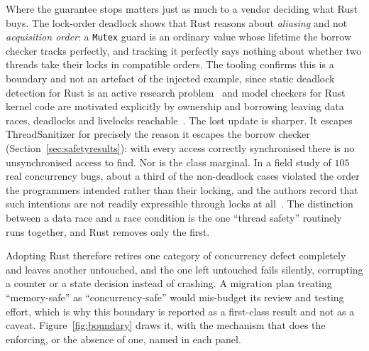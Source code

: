 \documentclass[english,oneside,a4paper,censored,csm,software-track-2020]{HYthesisML}
\begin{document}
Where the guarantee stops matters just as much to a vendor deciding what Rust buys. The lock-order
deadlock shows that Rust reasons about \emph{aliasing} and not \emph{acquisition order}: a
\texttt{Mutex} guard is an ordinary value whose lifetime the borrow checker tracks perfectly, and
tracking it perfectly says nothing about whether two threads take their locks in compatible
orders. The tooling confirms this is a boundary and not an artefact of the injected example, since
static deadlock detection for Rust is an active research problem~\cite{zhang2026deadlock} and
model checkers for Rust kernel code are motivated explicitly by ownership and borrowing leaving
data races, deadlocks and livelocks reachable~\cite{tang2025converos}. The lost update is sharper.
It escapes ThreadSanitizer for precisely the reason it escapes the borrow checker
(Section~\ref{sec:safetyresults}): with every access correctly synchronised there is no
unsynchronised access to find. Nor is the class marginal. In a field study of $105$ real
concurrency bugs, about a third of the non-deadlock cases violated the order the programmers
intended rather than their locking, and the authors record that such intentions are not readily
expressible through locks at all~\cite{lu2008mistakes}. The distinction between a data race and a
race condition is the one ``thread safety'' routinely runs together, and Rust removes only the
first.

Adopting Rust therefore retires one category of concurrency defect completely and leaves another
untouched, and the one left untouched fails silently, corrupting a counter or a state decision
instead of crashing. A migration plan treating ``memory-safe'' as ``concurrency-safe'' would
mis-budget its review and testing effort, which is why this boundary is reported as a first-class
result and not as a caveat. Figure~\ref{fig:boundary} draws it, with the mechanism that does the
enforcing, or the absence of one, named in each panel.
\end{document}
